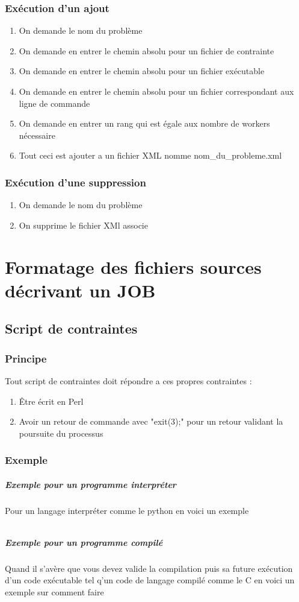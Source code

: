 \documentclass[11pt]{article}
\begin{document}
\subsubsection{Exécution d'un ajout}
\begin{enumerate}
\item On demande le nom du problème 
\item On demande en entrer le chemin absolu pour un fichier de contrainte
\item On demande en entrer le chemin absolu pour un fichier exécutable
\item On demande en entrer le chemin absolu pour un fichier correspondant aux ligne de commande
\item On demande en entrer un rang qui est égale aux nombre de workers nécessaire 
\item Tout ceci est ajouter a un fichier XML nomme nom\_du\_probleme.xml
\end{enumerate}

\newpage\subsubsection{Exécution d'une suppression}
\begin{enumerate}
\item On demande le nom du problème 
\item On supprime le fichier XMl associe 
\end{enumerate}
\newpage
\section{Formatage des fichiers sources décrivant un JOB}
\subsection{Script de contraintes}
\subsubsection{Principe}
Tout script de contraintes doit répondre a ces propres contraintes :
\begin{enumerate}
\item Être écrit en Perl
\item Avoir un retour de commande avec "exit(3);" pour un retour validant la poursuite du processus 

\end{enumerate}
\subsubsection{Exemple}
\subparagraph{Exemple pour un programme interpréter}
Pour un langage interpréter comme le python en voici un exemple
\inputminted{perl}{../Echantillon_Script_Perl/nqueen.pl}
\subparagraph{Exemple pour un programme compilé }
Quand il s'avère que vous devez valide la compilation puis sa future exécution d'un code exécutable tel q'un code de langage compilé comme le C en voici un exemple sur comment faire 
\inputminted{perl}{../Echantillon_Script_Perl/langford.pl}
\end{document}
